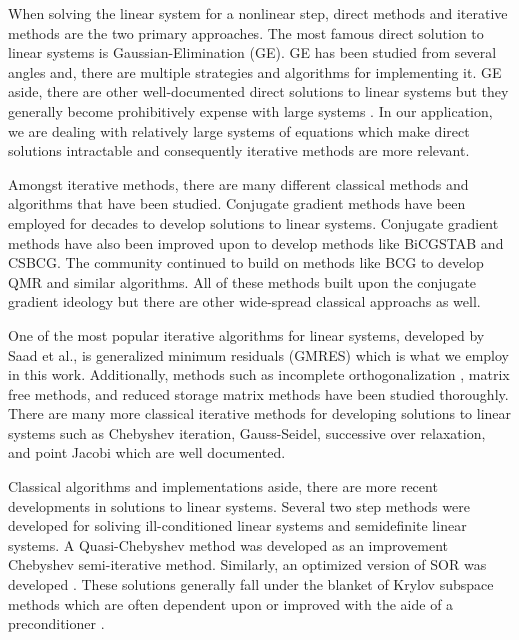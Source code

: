 \documentclass{article}
\begin{document}
When solving the linear system for a nonlinear step, direct methods and iterative methods are the two primary approaches.
The most famous direct solution to linear systems is Gaussian-Elimination (GE)\cite{grcar2011ordinary, higham2011gaussian}.
GE has been studied from several angles and, there are multiple strategies and algorithms for implementing it\cite{trefethen1997numerical}.
GE aside, there are other well-documented direct solutions to linear systems \cite{heldring2007fast, duff2017direct} but they generally become prohibitively expense with large systems \cite{pearson2020preconditioners}.
In our application, we are dealing with relatively large systems of equations which make direct solutions intractable and consequently iterative methods are more relevant.

Amongst iterative methods, there are many different classical methods and algorithms that have been studied.
Conjugate gradient methods have been employed for decades to develop solutions to linear systems\cite{chandra1978conjugate}.
Conjugate gradient methods have also been improved upon to develop methods like BiCGSTAB\cite{van1992bi} and CSBCG\cite{bank1994composite}.
The community continued to build on methods like BCG to develop QMR and similar algorithms\cite{freund1991qmr}.
All of these methods built upon the conjugate gradient ideology but there are other wide-spread classical approachs as well.

One of the most popular iterative algorithms for linear systems, developed by Saad et al., is generalized minimum residuals (GMRES)\cite{saad1986gmres} which is what we employ in this work.
Additionally, methods such as incomplete orthogonalization \cite{gear1983iterative}, matrix free methods\cite{brown1986matrix}, and reduced storage matrix methods\cite{brown_reduced_1989} have been studied thoroughly.
There are many more classical iterative methods for developing solutions to linear systems such as Chebyshev iteration, Gauss-Seidel, successive over relaxation, and point Jacobi which are well documented\cite{hageman1981applied, vorst1997linear, saad2003iterative}.

Classical algorithms and implementations aside, there are more recent developments in solutions to linear systems\cite{tropp2010computational}.
Several two step methods were developed for soliving ill-conditioned linear systems\cite{salkuyeh2011new, beik2018iterative} and semidefinite linear systems\cite{salkuyeh2014iterative}.
A Quasi-Chebyshev method was developed as an improvement Chebyshev semi-iterative method\cite{wen2013quasi}.
Similarly, an optimized version of SOR was developed \cite{meng2014practical}.
These solutions generally fall under the blanket of Krylov subspace methods which are often dependent upon or improved with the aide of a preconditioner \cite{benzi2002preconditioning, pearson2020preconditioners}.
\end{document}
